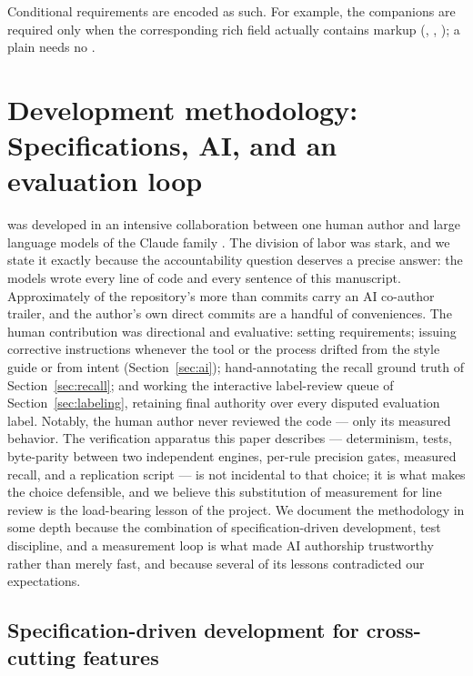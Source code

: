 \documentclass[nojss,article]{jss}
\newcommand{\rulelink}[1]{\hyperlink{rule:#1}{\code{#1}}}
\begin{document}
Conditional requirements are encoded as such. For example, the
 companions are required only when the
corresponding rich field actually contains markup
(\rulelink{JSS-PRE-003}, \rulelink{JSS-PRE-007},
\rulelink{JSS-PRE-008}); a plain  needs
no .

\clearpage
\section{Development methodology: Specifications, AI, and an evaluation loop}
\label{sec:method}

 was developed in an intensive collaboration between
one human author and large language models of the Claude family
\citep{claude}. The division of labor was stark, and we state it
exactly because the accountability question deserves a precise
answer: the models wrote every line of code and every sentence of
this manuscript. Approximately \StatAICommitsApprox{} of the
repository's more than \StatCommitsApprox{} commits carry an AI
co-author trailer, and the author's own direct commits are a handful
of conveniences. The human contribution was directional and
evaluative: setting requirements; issuing corrective instructions
whenever the tool or the process drifted from the style guide or
from intent (Section~\ref{sec:ai}); hand-annotating the recall
ground truth of Section~\ref{sec:recall}; and working the
interactive label-review queue of Section~\ref{sec:labeling},
retaining final authority over every disputed evaluation label.
Notably, the human author never reviewed the code --- only its
measured behavior. The verification apparatus this paper describes
--- determinism, \StatTestCount{} tests, byte-parity between two
independent engines, per-rule precision gates, measured recall, and
a replication script --- is not incidental to that choice; it is
what makes the choice defensible, and we believe this substitution
of measurement for line review is the load-bearing lesson of the
project. We document the methodology in some depth because the
combination of specification-driven development, test discipline,
and a measurement loop is what made AI authorship trustworthy rather
than merely fast, and because several of its lessons contradicted
our expectations.

\subsection{Specification-driven development for cross-cutting features}
\label{sec:speckit}
\end{document}
